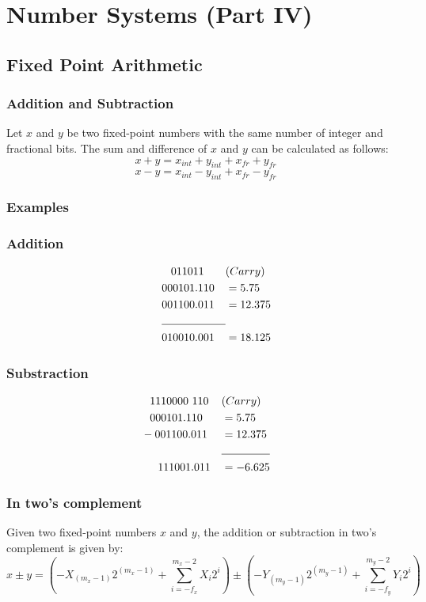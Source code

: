 \documentclass[12pt,openany, tikz,border=10pt]{book}
\begin{document}
\chapter{Number Systems (Part IV)}
\section{Fixed Point Arithmetic}
\subsection{Addition and Subtraction}

Let \( x \) and \( y \) be two fixed-point numbers with the same number of integer and fractional bits. The sum and difference of \( x \) and \( y \) can be calculated as follows:
 $$x + y = x_{int} + y_{int} + x_{fr} + y_{fr}$$ 
 $$x - y = x_{int} - y_{int} + x_{fr} - y_{fr}$$

\subsection*{Examples}

\subsection*{Addition}
\begin{align*}
& \phantom{X} & & \; \; \; 011011 & &(Carry) \\
& & &000101.110 & &= 5.75 \\
& & &001100.011 & &= 12.375 \\
&\cline{2-4}
& & &010010.001 & &= 18.125
\end{align*}
        
\subsection*{Substraction}

\begin{align*}
    & \phantom{-}1110000\ 110 & & (Carry) \\
    & \phantom{-}000101.110 &&= 5.75 \\
    & -001100.011 &&= 12.375 \\
    &\cline{2-4}
    & \phantom{000}111001.011 &&= -6.625
    \end{align*}

\newpage
\subsection*{In two's complement}
Given two fixed-point numbers $x$ and $y$, the addition or subtraction in two's complement is given by:
\begin{equation}
x \pm y = \left( -X_{(m_x-1)}2^{(m_x-1)} + \sum_{i=-f_x}^{m_x-2} X_i2^i \right) \pm \left( -Y_{(m_y-1)}2^{(m_y-1)} + \sum_{i=-f_y}^{m_y-2} Y_i2^i \right)
\end{equation}
\end{document}
